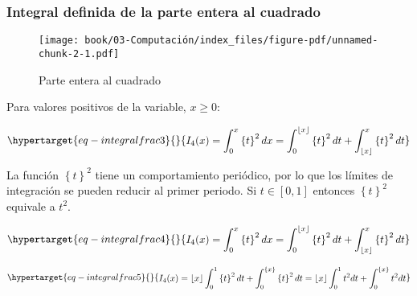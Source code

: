 \documentclass[
  letterpaper,
  DIV=11,
  numbers=noendperiod]{scrreprt}
\begin{document}
\hypertarget{integral-definida-de-la-parte-entera-al-cuadrado}{%
\subsubsection{Integral definida de la parte entera al
cuadrado}\label{integral-definida-de-la-parte-entera-al-cuadrado}}

\begin{figure}

{\centering \texttt{[image: book/03-Computación/index\_files/figure-pdf/unnamed-chunk-2-1.pdf]}

}

\caption{Parte entera al cuadrado}

\end{figure}

Para valores positivos de la variable, \(x\geq 0\):

\begin{equation}\protect\hypertarget{eq-integralfrac3}{}{
\begin{multline}
I_{4}(x)= \int_0^x \left\{{t}\right\}^2 dx =
\int_0^{\left\lfloor x \right\rfloor} \left\{{t}\right\}^2 dt +
\int_{{\left\lfloor x \right\rfloor}}^{x} \left\{{t}\right\}^2 dt
\end{multline}
}\label{eq-integralfrac3}\end{equation}

La función \(\left\{ t \right\}^2\) tiene un comportamiento periódico,
por lo que los límites de integración se pueden reducir al primer
periodo. Si \(t \in [0,1]\) entonces \(\left\{ t \right\}^2\) equivale a
\(t^2\).

\begin{equation}\protect\hypertarget{eq-integralfrac4}{}{
\begin{multline}
I_{4}(x)= \int_0^x \left\{{t}\right\}^2 dx =
\int_0^{\left\lfloor x \right\rfloor} \left\{{t}\right\}^2 dt +
\int_{{\left\lfloor x \right\rfloor}}^{x} \left\{{t}\right\}^2 dt
\end{multline}
}\label{eq-integralfrac4}\end{equation}

\begin{equation}\protect\hypertarget{eq-integralfrac5}{}{
\begin{multline}
I_4(x) =
\left\lfloor x \right\rfloor \int_{0}^{1} {\left\{{t}\right\}^2 dt} +
\int_0^{\left\{ x \right\}}{\left\{{t}\right\}^2 dt} = 
\left\lfloor x \right\rfloor \int_{0}^{1}{t^2 dt} + 
\int_0^{\left\{ x \right\}} {t^2 dt}
\end{multline}
}\label{eq-integralfrac5}\end{equation}
\end{document}
